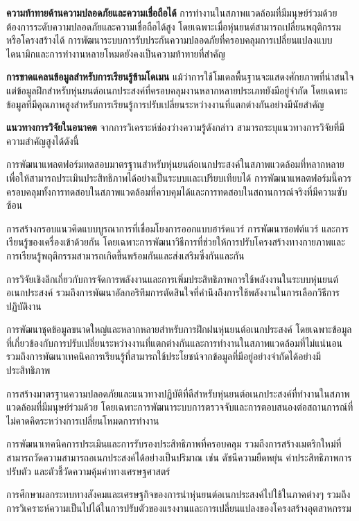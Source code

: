 \documentclass[a4paper]{article}
\begin{document}
\textbf{ความท้าทายด้านความปลอดภัยและความเชื่อถือได้} การทำงานในสภาพแวดล้อมที่มีมนุษย์ร่วมด้วยต้องการระดับความปลอดภัยและความเชื่อถือได้สูง โดยเฉพาะเมื่อหุ่นยนต์สามารถเปลี่ยนพฤติกรรมหรือโครงสร้างได้ การพัฒนาระบบการรับประกันความปลอดภัยที่ครอบคลุมการเปลี่ยนแปลงแบบไดนามิกและการทำงานหลายโหมดยังคงเป็นความท้าทายที่สำคัญ

\textbf{การขาดแคลนข้อมูลสำหรับการเรียนรู้ข้ามโดเมน} แม้ว่าการใช้โมเดลพื้นฐานจะแสดงศักยภาพที่น่าสนใจ แต่ข้อมูลฝึกสำหรับหุ่นยนต์อเนกประสงค์ที่ครอบคลุมงานหลากหลายประเภทยังมีอยู่จำกัด โดยเฉพาะข้อมูลที่มีคุณภาพสูงสำหรับการเรียนรู้การปรับเปลี่ยนระหว่างงานที่แตกต่างกันอย่างมีนัยสำคัญ

\textbf{แนวทางการวิจัยในอนาคต} จากการวิเคราะห์ช่องว่างความรู้ดังกล่าว สามารถระบุแนวทางการวิจัยที่มีความสำคัญสูงได้ดังนี้

การพัฒนาแพลตฟอร์มทดสอบมาตรฐานสำหรับหุ่นยนต์อเนกประสงค์ในสภาพแวดล้อมที่หลากหลาย เพื่อให้สามารถประเมินประสิทธิภาพได้อย่างเป็นระบบและเปรียบเทียบได้ การพัฒนาแพลตฟอร์มนี้ควรครอบคลุมทั้งการทดสอบในสภาพแวดล้อมที่ควบคุมได้และการทดสอบในสถานการณ์จริงที่มีความซับซ้อน

การสร้างกรอบแนวคิดแบบบูรณาการที่เชื่อมโยงการออกแบบฮาร์ดแวร์ การพัฒนาซอฟต์แวร์ และการเรียนรู้ของเครื่องเข้าด้วยกัน โดยเฉพาะการพัฒนาวิธีการที่ช่วยให้การปรับโครงสร้างทางกายภาพและการเรียนรู้พฤติกรรมสามารถเกิดขึ้นพร้อมกันและส่งเสริมซึ่งกันและกัน

การวิจัยเชิงลึกเกี่ยวกับการจัดการพลังงานและการเพิ่มประสิทธิภาพการใช้พลังงานในระบบหุ่นยนต์อเนกประสงค์ รวมถึงการพัฒนาอัลกอริทึมการตัดสินใจที่คำนึงถึงการใช้พลังงานในการเลือกวิธีการปฏิบัติงาน

การพัฒนาชุดข้อมูลขนาดใหญ่และหลากหลายสำหรับการฝึกฝนหุ่นยนต์อเนกประสงค์ โดยเฉพาะข้อมูลที่เกี่ยวข้องกับการปรับเปลี่ยนระหว่างงานที่แตกต่างกันและการทำงานในสภาพแวดล้อมที่ไม่แน่นอน รวมถึงการพัฒนาเทคนิคการเรียนรู้ที่สามารถใช้ประโยชน์จากข้อมูลที่มีอยู่อย่างจำกัดได้อย่างมีประสิทธิภาพ

การสร้างมาตรฐานความปลอดภัยและแนวทางปฏิบัติที่ดีสำหรับหุ่นยนต์อเนกประสงค์ที่ทำงานในสภาพแวดล้อมที่มีมนุษย์ร่วมด้วย โดยเฉพาะการพัฒนาระบบการตรวจจับและการตอบสนองต่อสถานการณ์ที่ไม่คาดคิดระหว่างการเปลี่ยนโหมดการทำงาน

การพัฒนาเทคนิคการประเมินและการรับรองประสิทธิภาพที่ครอบคลุม รวมถึงการสร้างเมตริกใหม่ที่สามารถวัดความสามารถอเนกประสงค์ได้อย่างเป็นปริมาณ เช่น ดัชนีความยืดหยุ่น ค่าประสิทธิภาพการปรับตัว และตัวชี้วัดความคุ้มค่าทางเศรษฐศาสตร์

การศึกษาผลกระทบทางสังคมและเศรษฐกิจของการนำหุ่นยนต์อเนกประสงค์ไปใช้ในภาคต่างๆ รวมถึงการวิเคราะห์ความเป็นไปได้ในการปรับตัวของแรงงานและการเปลี่ยนแปลงของโครงสร้างอุตสาหกรรม
\end{document}
